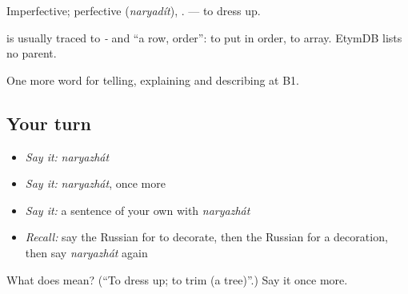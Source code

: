Imperfective; perfective \emph{} (\emph{naryadít}), \emph{}. \emph{} — to dress up.

\begin{cousinweb}
\emph{} is usually traced to \emph{-} and \emph{} \textquotedblleft{}a row, order\textquotedblright{}: to put in order, to array. EtymDB lists no parent.
\end{cousinweb}

\begin{grammarlens}[title={What you've built}]
One more word for telling, explaining and describing at B1.
\end{grammarlens}

\subsection*{Your turn}
\begin{itemize}
\raggedright
  \item \emph{Say it:} \emph{naryazhát}
  \item \emph{Say it:} \emph{naryazhát}, once more
  \item \emph{Say it:} a sentence of your own with \emph{naryazhát}
  \item \emph{Recall:} say the Russian for to decorate, then the Russian for a decoration, then say \emph{naryazhát} again
\end{itemize}

\begin{tcolorbox}[breakable,colback=teal!4,colframe=teal!35!black,title={Before you move on}]
What does  mean? (\textquotedblleft{}To dress up; to trim (a tree)\textquotedblright{}.) Say it once more.
\end{tcolorbox}
